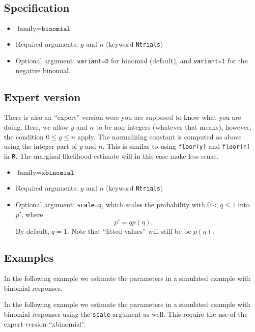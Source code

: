 \documentclass[a4paper,11pt]{article}
\begin{document}
\subsection*{Specification}

\begin{itemize}
\item $\text{family}=\texttt{binomial}$
\item Required arguments: $y$ and $n$ (keyword \texttt{Ntrials})
\item Optional argument: \texttt{variant=0} for binomial (default),
    and \texttt{variant=1} for the negative binomial.
\end{itemize}


\subsection*{Expert version}

There is also an ``expert'' version were you are supposed to know what
you are doing. Here, we allow $y$ and $n$ to be non-integers (whatever
that means), however, the condition $0\le y \le n$ apply. The
normalizing constant is computed as above using the integer part of
$y$ and $n$. This is similar to using \verb|floor(y)| and
\verb|floor(n)| in \verb|R|. The marginal likelihood estimate will in
this case make less sense.
\begin{itemize}
\item $\text{family}=\texttt{xbinomial}$
\item Required arguments: $y$ and $n$ (keyword \texttt{Ntrials})
\item Optional argument: \texttt{scale=q}, which scales the
    probability with $0<q\le1$ into $p'$, where
    \begin{displaymath}
        p' = q p(\eta).
    \end{displaymath}
    By default, $q=1$. Note that ``fitted values'' will still be be
    $p(\eta)$. 
\end{itemize}


\subsection*{Examples}

In the following example we estimate the parameters in a simulated
example with binomial responses.


In the following example we estimate the parameters in a simulated
example with binomial responses using the \texttt{scale}-argument as
well. This require the use of the expert-version ``xbinomial''.

\end{document}
